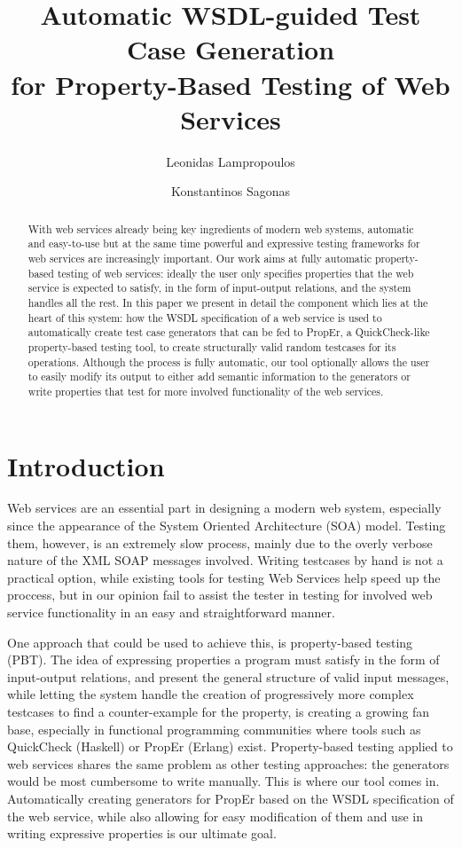 \documentclass[submission,copyright,a4]{eptcs}
\title{Automatic WSDL-guided Test Case Generation\\
       for Property-Based Testing of Web Services}
\author{Leonidas Lampropoulos \and Konstantinos Sagonas}
\begin{document}
\maketitle

\begin{abstract}
With web services already being key ingredients of modern web systems,
automatic and easy-to-use but at the same time powerful and expressive
testing frameworks for web services are increasingly important. Our
work aims at fully automatic property-based testing of web services:
ideally the user only specifies properties that the web service is
expected to satisfy, in the form of input-output relations, and the
system handles all the rest. In this paper we present in detail the
component which lies at the heart of this system: how the WSDL
specification of a web service is used to automatically create test
case generators that can be fed to PropEr, a QuickCheck-like
property-based testing tool, to create structurally valid random
testcases for its operations. Although the process is fully automatic,
our tool optionally allows the user to easily modify its output to
either add semantic information to the generators or write properties
that test for more involved functionality of the web services.
\end{abstract}


\section{Introduction}



Web services are an essential part in designing a modern web system, 
especially since the appearance of the System Oriented Architecture (SOA)
model. Testing them, however, is an extremely slow process, mainly due to
the overly verbose nature of the XML SOAP messages involved. Writing 
testcases by hand is not a practical option, while existing tools for 
testing Web Services help speed up the proccess, but in our opinion fail 
to assist the tester in testing for involved web service functionality
in an easy and straightforward manner.


One approach that could be used to achieve this, is property-based testing (PBT).
The idea of expressing properties a program must satisfy in the form of 
input-output relations, and present the general structure of valid input 
messages, while letting the system handle the creation of progressively more 
complex testcases to find a counter-example for the property, is creating a 
growing fan base, especially in functional programming communities where 
tools such as QuickCheck (Haskell) or PropEr (Erlang) exist. Property-based 
testing applied to web services shares the same problem as other testing 
approaches: the generators would be most cumbersome to write manually. This is
where our tool comes in. Automatically creating generators for PropEr based on 
the WSDL specification of the web service, while also allowing for easy 
modification of them and use in writing expressive properties is our ultimate goal.
\end{document}
